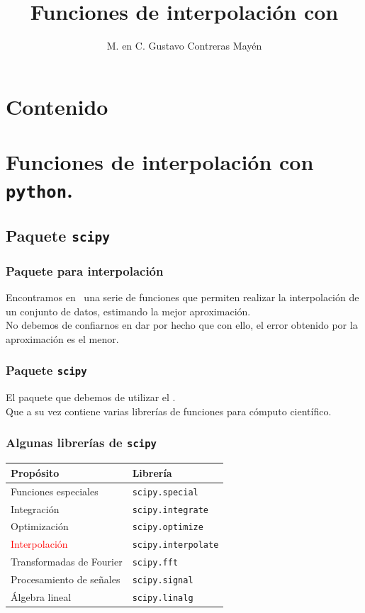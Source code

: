 



\title{Funciones de interpolación con \python}
\author{M. en C. Gustavo Contreras Mayén}

\maketitle
\fontsize{14}{14}\selectfont
{}
\section*{Contenido}
\section{Funciones de interpolación con \texttt{python}.}
\subsection{Paquete \texttt{scipy}}
\begin{frame}
\frametitle{Paquete para interpolación}
Encontramos en \python\ una serie de funciones que permiten realizar la interpolación de un conjunto de datos, estimando la mejor aproximación.
\\
\bigskip
No debemos de confiarnos en dar por hecho que con ello, el error obtenido por la aproximación es el menor.
\end{frame}
\begin{frame}
\frametitle{Paquete \texttt{scipy}}
El paquete que debemos de utilizar el .
\\
\bigskip
Que a su vez contiene varias librerías de funciones para cómputo científico.
\end{frame}
\begin{frame}
\frametitle{Algunas librerías de \texttt{scipy}}
\begin{table}
\fontsize{12}{12}\selectfont
\centering
\begin{tabular}{l l}
Propósito & Librería \\ \hline
Funciones especiales & \texttt{scipy.special} \\ \hline
Integración &\texttt{scipy.integrate} \\ \hline
Optimización & \texttt{scipy.optimize} \\ \hline
\textcolor{red}{Interpolación} & \texttt{scipy.interpolate} \\ \hline
Transformadas de Fourier & \texttt{scipy.fft} \\ \hline
Procesamiento de señales & \texttt{scipy.signal} \\ \hline 
Álgebra lineal & \texttt{scipy.linalg} \\ \hline
\end{tabular}
\end{table}
\end{frame}
